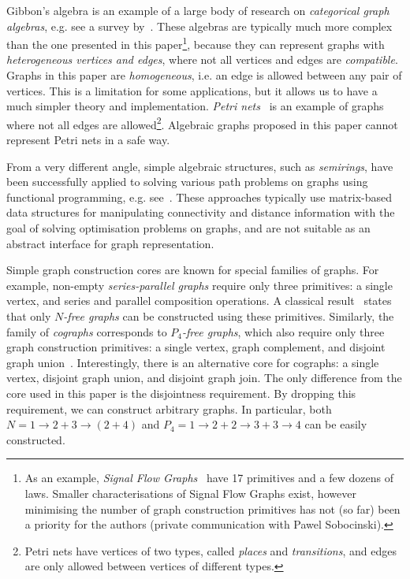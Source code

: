 Gibbon's algebra is an example of a large body of research on \emph{categorical
graph algebras}, e.g. see a survey by~\citet{2010_selinger_survey}. These algebras
are typically much more complex than the one presented in this paper\footnote{As an
example, \emph{Signal Flow Graphs}~\cite{2015_bonchi_sfg} have 17 primitives
and a few dozens of laws. Smaller characterisations of Signal Flow Graphs exist,
however minimising the number of graph construction primitives has not (so far) been
a priority for the authors (private communication with Pawel Sobocinski).},
because they can represent graphs with
\emph{heterogeneous vertices and edges}, where not all vertices
and edges are \emph{compatible}. Graphs in this paper are \emph{homogeneous}, i.e.
an edge is allowed between any pair of vertices. This is a limitation for some
applications, but it allows us to have a much simpler theory and implementation.
\emph{Petri nets}~\cite{1989_murata_pn} is an example of graphs where not all
edges are allowed\footnote{Petri nets have vertices of two types, called \emph{places}
and \emph{transitions}, and edges are only allowed between vertices of different
types.}.
Algebraic graphs proposed in this paper cannot represent Petri
nets in a safe way.

From a very different angle, simple algebraic structures, such as \emph{semirings},
have been successfully applied to solving various path problems on graphs using
functional programming, e.g. see~\citet{2013_semirings_dolan}. These approaches
typically use matrix-based data structures for manipulating connectivity and distance
information with the goal of solving optimisation problems on graphs, and are not
suitable as an abstract interface for graph representation.

Simple graph construction cores are known for special families of graphs. For example,
non-empty \emph{series-parallel graphs} require only three primitives: a single vertex,
and series and parallel composition operations. A classical result~\cite{1979_valdes_sp}
states that only \emph{$N$-free graphs} can be constructed using these primitives.
Similarly, the family of \emph{cographs} corresponds to \emph{$P_4$-free graphs}, which
also require only three graph construction primitives: a single vertex, graph complement,
and disjoint graph union~\cite{1981_corneil_cographs}. Interestingly, there is an
alternative core for cographs: a single vertex, disjoint graph union, and disjoint graph
join. The only difference from the core used in this paper is the disjointness requirement.
By dropping this requirement, we can construct arbitrary graphs. In particular, both
$N = 1 \rightarrow 2 + 3 \rightarrow (2 + 4)$ and
$P_4 = 1 \rightarrow 2 + 2 \rightarrow 3 + 3 \rightarrow 4$ can be easily constructed.

